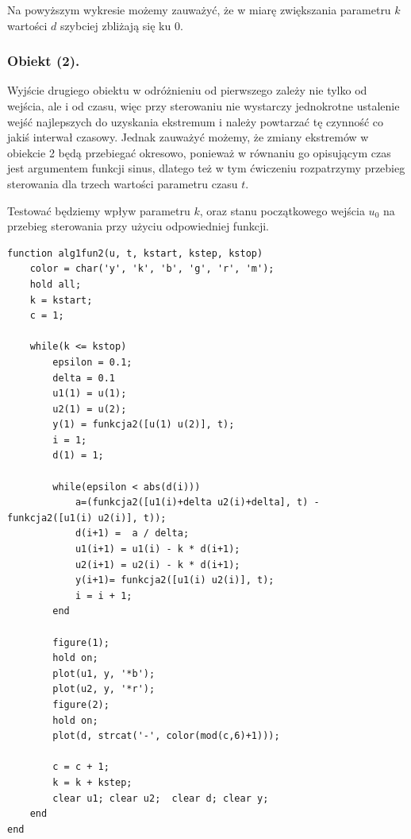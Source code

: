 \documentclass[a4paper,10pt]{article}
\begin{document}
Na powyższym wykresie możemy zauważyć, że w miarę zwiększania parametru $k$ wartości $d$ szybciej zbliżają się ku $0$.

\subsubsection{Obiekt (2).}

Wyjście drugiego obiektu w odróżnieniu od pierwszego zależy nie tylko od wejścia, ale i od czasu, więc przy sterowaniu nie wystarczy jednokrotne ustalenie wejść najlepszych do uzyskania ekstremum i należy powtarzać tę czynność co jakiś interwał czasowy. Jednak zauważyć możemy, że zmiany ekstremów w obiekcie 2 będą przebiegać okresowo, ponieważ w równaniu go opisującym czas jest argumentem funkcji sinus, dlatego też w tym ćwiczeniu rozpatrzymy przebieg sterowania dla trzech wartości parametru czasu $t$.

Testować będziemy wpływ parametru $k$, oraz stanu początkowego wejścia $u_0$ na przebieg sterowania przy użyciu odpowiedniej funkcji.
\begin{lstlisting}[caption=Funkcja testująca algorytm 1 dla obiektu 2.]
function alg1fun2(u, t, kstart, kstep, kstop)
    color = char('y', 'k', 'b', 'g', 'r', 'm');
    hold all;
    k = kstart;
    c = 1;
    
    while(k <= kstop)
        epsilon = 0.1;
        delta = 0.1
        u1(1) = u(1);
        u2(1) = u(2);
        y(1) = funkcja2([u(1) u(2)], t);
        i = 1;
        d(1) = 1;
        
        while(epsilon < abs(d(i)))
            a=(funkcja2([u1(i)+delta u2(i)+delta], t) - funkcja2([u1(i) u2(i)], t));
            d(i+1) =  a / delta;
            u1(i+1) = u1(i) - k * d(i+1);
            u2(i+1) = u2(i) - k * d(i+1);
            y(i+1)= funkcja2([u1(i) u2(i)], t);
            i = i + 1;
        end

        figure(1);
        hold on;
        plot(u1, y, '*b');
        plot(u2, y, '*r');
        figure(2);
        hold on;
        plot(d, strcat('-', color(mod(c,6)+1)));
       
        c = c + 1;
        k = k + kstep;
        clear u1; clear u2;  clear d; clear y;
    end
end
\end{lstlisting}
\end{document}
